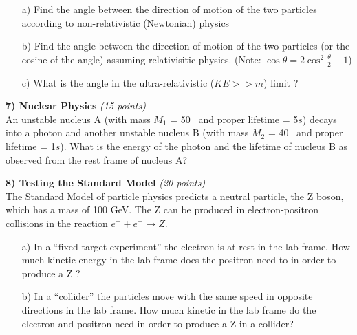 {\begin{itemize}
\item[a)]Find the angle between the direction of motion of the two particles according to non-relativistic (Newtonian) physics 

\vspace{3.in}

\item[b)]Find the angle between the direction of motion of the two particles (or the cosine of the angle) assuming relativisitic physics. (Note: $\cos \theta = 2 \cos^2 \frac{\theta}{2} - 1$)

\vspace{3in}

\item[c)]What is the angle in the ultra-relativistic  ($KE >> m$) limit ? 

\end{itemize}



\clearpage



\textbf{7) Nuclear Physics }\hfill \textit{(15 points)}\\

An unstable nucleus A (with mass $M_1$ = 50 \GeV\ and proper lifetime = 5$s$) decays into a photon and another unstable nucleus B (with mass $M_2$ = 40 \GeV\ and proper lifetime = 1$s$).
What is the energy of the photon and the lifetime of nucleus B as observed from the rest frame of nucleus A?


\clearpage
\textbf{8) Testing the Standard Model }\hfill \textit{(20 points)}\\
The Standard Model of particle physics predicts a neutral particle, the Z boson, which has a mass of 100 GeV.
The Z can be produced in electron-positron collisions in the reaction $e^+ + e^- \rightarrow Z$.

\begin{itemize}
\item[a)]In a ``fixed target experiment'' the electron is at rest in the lab frame. 
How much kinetic energy in the lab frame does the positron need to in order to produce a Z ?

\vspace{3.75in}

\item[b)] In a ``collider'' the particles move with the same speed in opposite directions in the lab frame.
How much kinetic in the lab frame do the electron and positron need in order to produce a Z in a collider?
\end{itemize}


} %

